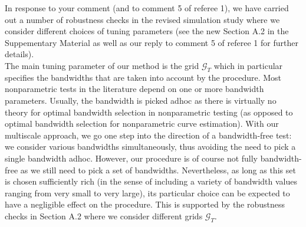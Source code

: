 \documentclass[a4paper,12pt]{article}
\begin{document}
\begin{enumerate}[label=\arabic*.,leftmargin=0.6cm]
In response to your comment (and to comment 5 of referee 1), we have carried out a number of robustness checks in the revised simulation study where we consider different choices of tuning parameters (see the new Section A.2 in the Suppementary Material as well as our reply to comment 5 of referee 1 for further details). \\
The main tuning parameter of our method is the grid $\mathcal{G}_T$ which in particular specifies the bandwidths that are taken into account by the procedure.
Most nonparametric tests in the literature depend on one or more bandwidth parameters. Usually, the bandwidth is picked adhoc as there is virtually no theory for optimal bandwidth selection in nonparametric testing (as opposed to optimal bandwidth selection for nonparametric curve estimation). With our multiscale approach, we go one step into the direction of a bandwidth-free test: we consider various bandwidths simultaneously, thus avoiding the need to pick a single bandwidth adhoc. However, our procedure is of course not fully bandwidth-free as we still need to pick a set of bandwidths. Nevertheless, as long as this set is chosen sufficiently rich (in the sense of including a variety of bandwidth values ranging from very small to very large), its particular choice can be expected to have a negligible effect on the procedure. This is supported by the robustness checks in Section A.2 where we consider different grids $\mathcal{G}_T$. \\

\end{enumerate}
\end{document}
